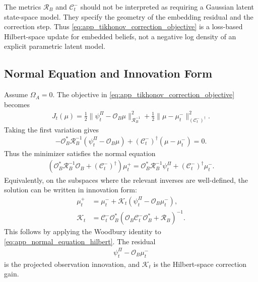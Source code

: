 \documentclass[twoside,11pt]{article}
\begin{document}
The metrics $\mathcal R_B$ and $\mathcal C_t^-$ should not be interpreted
as requiring a Gaussian latent state-space model. They specify the
geometry of the embedding residual and the correction step. Thus
\eqref{eq:app_tikhonov_correction_objective} is a loss-based
Hilbert-space update for embedded beliefs, not a negative log density of
an explicit parametric latent model.

\subsection{Normal Equation and Innovation Form}

Assume $\Omega_A=0$. The objective in
\eqref{eq:app_tikhonov_correction_objective} becomes
\begin{align}
J_t(\mu)
=
\frac12
\|\psi_t^\Pi-\mathcal O_B\mu\|_{\mathcal R_B^{-1}}^2
+
\frac12
\|\mu-\mu_t^-\|_{(\mathcal C_t^-)^\dagger}^2.
\label{eq:app_quadratic_correction_objective}
\end{align}
Taking the first variation gives
\begin{align}
-
\mathcal O_B^\ast
\mathcal R_B^{-1}
\left(
\psi_t^\Pi-\mathcal O_B\mu
\right)
+
(\mathcal C_t^-)^\dagger
(\mu-\mu_t^-)
=
0.
\label{eq:app_first_variation}
\end{align}
Thus the minimizer satisfies the normal equation
\begin{align}
\left(
\mathcal O_B^\ast
\mathcal R_B^{-1}
\mathcal O_B
+
(\mathcal C_t^-)^\dagger
\right)
\mu_t^+
=
\mathcal O_B^\ast
\mathcal R_B^{-1}
\psi_t^\Pi
+
(\mathcal C_t^-)^\dagger
\mu_t^-.
\label{eq:app_normal_equation_hilbert}
\end{align}
Equivalently, on the subspaces where the relevant inverses are
well-defined, the solution can be written in innovation form:
\begin{align}
\mu_t^+
&=
\mu_t^-
+
\mathcal K_t
\left(
\psi_t^\Pi-\mathcal O_B\mu_t^-
\right),
\label{eq:app_innovation_form_hilbert}
\\
\mathcal K_t
&=
\mathcal C_t^-
\mathcal O_B^\ast
\left(
\mathcal O_B\mathcal C_t^-\mathcal O_B^\ast
+
\mathcal R_B
\right)^{-1}.
\label{eq:app_gain_hilbert}
\end{align}
This follows by applying the Woodbury identity to
\eqref{eq:app_normal_equation_hilbert}. The residual
\begin{align}
\psi_t^\Pi-\mathcal O_B\mu_t^-
\end{align}
is the projected observation innovation, and $\mathcal K_t$ is the
Hilbert-space correction gain.
\end{document}
